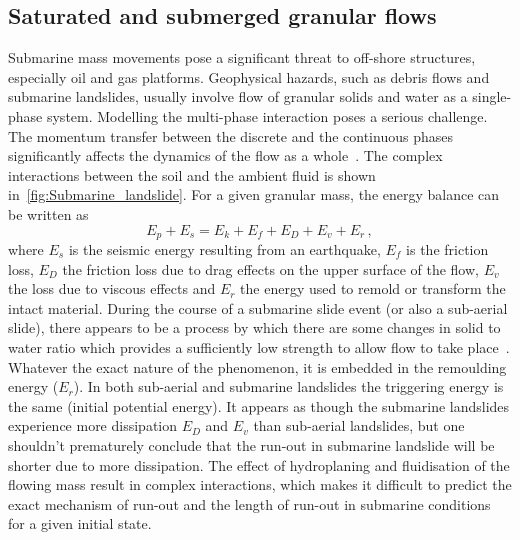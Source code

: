 \subsection{Saturated and submerged granular flows}
Submarine mass movements pose a significant threat to off-shore structures, 
especially oil and gas platforms. Geophysical hazards, such as debris flows and 
submarine landslides, usually involve flow of granular solids and water as a 
single-phase system. Modelling the multi-phase interaction poses a serious 
challenge. The momentum transfer between the discrete and the continuous phases 
significantly affects the dynamics of the flow as a whole~\citep{Topin2011}. 
The complex interactions between the soil and the ambient fluid is shown 
in~\cref{fig:Submarine_landslide}. For a given granular mass, the energy 
balance can be written as
%
\begin{equation}
E_p + E_s = E_k + E_f + E_D + E_v + E_r\,,
\end{equation}
where $E_s$ is the seismic energy resulting from an earthquake, $E_f$ is the 
friction loss, $E_D$ the friction loss due to drag effects on the upper surface 
of the flow, $E_v$ the loss due to viscous effects and $E_r$ the energy used to 
remold or transform the intact material. During the course of a submarine slide 
event (or also a sub-aerial slide), there appears to be a process by which 
there are some changes in solid to water ratio which provides a sufficiently 
low strength to allow flow to take place~\citep{Locat2002}. Whatever the exact 
nature of the phenomenon, it is embedded in the remoulding energy ($E_r$). In 
both sub-aerial and submarine landslides the triggering energy is the same 
(initial potential energy). It appears as though the submarine landslides 
experience more dissipation $E_D$ and $E_v$ than sub-aerial landslides, but one 
shouldn't prematurely conclude that the run-out in submarine landslide will be 
shorter due to more dissipation. The effect of hydroplaning and fluidisation of 
the flowing mass result in complex interactions, which makes it difficult to 
predict the exact mechanism of run-out and the length of run-out in 
submarine conditions for a given initial state. 

